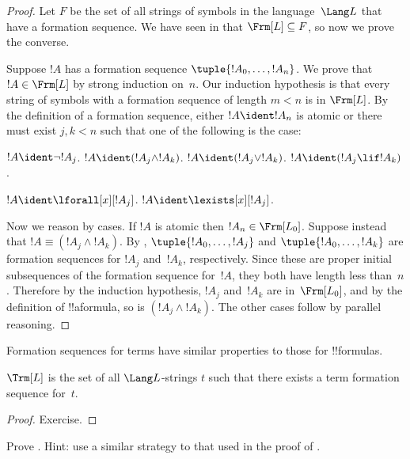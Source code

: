 \begin{proof}
Let $F$ be the set of all strings of symbols in the language~$\Lang L$
that have a formation sequence. We have seen in
 that $\Frm[L] \subseteq F$, so now
we prove the converse.

Suppose $!A$ has a formation sequence $\tuple{!A_0,\dotsc,!A_n}$.
We prove that $!A \in \Frm[L]$ by strong induction on~$n$.
Our induction hypothesis is that every string of symbols with a
formation sequence of length $m < n$ is in $\Frm[L]$.
By the definition of a formation sequence, either $!A \ident !A_n$ is
atomic or there must exist $j,k < n$ such that one of the
following is the case:
\begin{enumerate}
    $!A \ident \lnot !A_j$.
    $!A \ident (!A_j \land !A_k)$.
    $!A \ident (!A_j \lor !A_k)$.
    $!A \ident (!A_j \lif !A_k)$.
    
    $!A \ident \lforall[x][!A_j]$.
    $!A \ident \lexists[x][!A_j]$.
\end{enumerate}
Now we reason by cases. If $!A$ is atomic then
$!A_n \in \Frm[L_0]$. Suppose instead that
$!A \equiv (!A_j \land !A_k)$. By 
,
$\tuple{!A_0,\dotsc,!A_j}$ and $\tuple{!A_0,\dotsc,!A_k}$ are
formation sequences for $!A_j$ and~$!A_k$, respectively. Since
these are proper initial subsequences of the formation sequence
for~$!A$, they both have length less than~$n$. Therefore by
the induction hypothesis, $!A_j$ and~$!A_k$ are in~$\Frm[L_0]$,
and by the definition of !!a{formula}, so is
$(!A_j \land !A_k)$. The other cases follow by parallel
reasoning.
\end{proof}

Formation sequences for terms have similar properties to those
for !!{formula}s.

\begin{prop}
$\Trm[L]$ is the set of all $\Lang L$-strings $t$
such that there exists a term formation sequence for~$t$.
\end{prop}

\begin{proof}
Exercise.
\end{proof}

\begin{prob}
Prove .
Hint: use a similar strategy to that used in the proof of
.
\end{prob}

